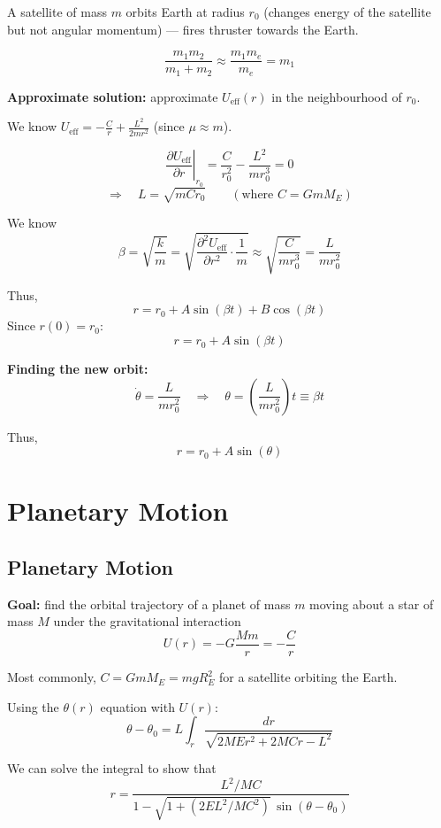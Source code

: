 A satellite of mass $m$ orbits Earth at radius $r_0$ (changes energy of the satellite but not angular momentum) — fires thruster towards the Earth.

\[
  \frac{m_1 m_2}{m_1 + m_2} \approx \frac{m_1 m_e}{m_e} = m_1
\]

\textbf{Approximate solution:} approximate $U_\text{eff}(r)$ in the neighbourhood of $r_0$.

We know $U_\text{eff} = -\frac{C}{r} + \frac{L^2}{2mr^2}$ (since $\mu \approx m$).

\[
  \left.\frac{\partial U_\text{eff}}{\partial r}\right|_{r_0} = \frac{C}{r_0^2} - \frac{L^2}{mr_0^3} = 0
\]
\[
  \Rightarrow \quad L = \sqrt{mCr_0} \qquad (\text{where } C = GmM_E)
\]

We know
\[
  \beta = \sqrt{\frac{k}{m}} = \sqrt{\frac{\partial^2 U_\text{eff}}{\partial r^2}\cdot\frac{1}{m}} \approx \sqrt{\frac{C}{mr_0^3}} = \frac{L}{mr_0^2}
\]

Thus,
\[
  r = r_0 + A\sin(\beta t) + B\cos(\beta t)
\]
Since $r(0) = r_0$:
\[
  r = r_0 + A\sin(\beta t)
\]

\textbf{Finding the new orbit:}
\[
  \dot{\theta} = \frac{L}{mr_0^2} \quad \Rightarrow \quad \theta = \left(\frac{L}{mr_0^2}\right)t \equiv \beta t
\]

Thus,
\[
  r = r_0 + A\sin(\theta)
\]

\chapter{Planetary Motion}

\section{Planetary Motion}

\textbf{Goal:} find the orbital trajectory of a planet of mass $m$ moving about a star of mass $M$ under the gravitational interaction
\[
  U(r) = -G\frac{Mm}{r} = -\frac{C}{r}
\]

Most commonly, $C = GmM_E = mg R_E^2$ for a satellite orbiting the Earth.

Using the $\theta(r)$ equation with $U(r)$:
\[
  \boxed{\theta - \theta_0 = L\int_r \frac{dr}{\sqrt{2MEr^2 + 2MCr - L^2}}}
\]

We can solve the integral to show that
\begin{equation}
  r = \frac{L^2/MC}{1 - \sqrt{1 + (2EL^2/MC^2)}\,\sin(\theta - \theta_0)} \tag{1}
\end{equation}

